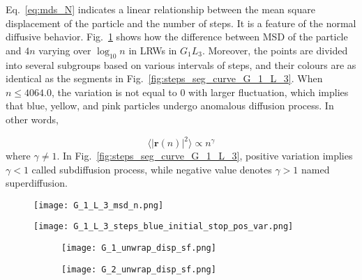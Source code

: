      Eq.~\ref{eq:mds_N} indicates a linear relationship between the
     mean square displacement of the particle and the number of
     steps. It is a feature of the normal diffusive
     behavior. Fig.~\ref{fig:G_1_L_3_msd_n} shows how the difference
     between MSD of the particle and $4n$ varying over $\log_{10}n$ in
     LRWs in $G_1L_3$. Moreover, the points are divided into several
     subgroups based on various intervals of steps, and their colours
     are as identical as the segments in
     Fig.~\ref{fig:steps_seg_curve_G_1_L_3}. When $n \leq 4064.0$, the
     variation is not equal to $0$ with larger fluctuation, which
     implies that blue, yellow, and pink particles undergo anomalous
     diffusion process. In other words,

     \begin{equation}\label{eq:anomalous_diffusion}
       \langle \lvert \bm{r}(n) \lvert^2 \rangle \propto n^{\gamma}
     \end{equation}
     where $\gamma \ne 1$. In Fig.~\ref{fig:steps_seg_curve_G_1_L_3},
     positive variation implies $\gamma < 1$ called subdiffusion
     process, while negative value denotes $\gamma > 1$ named
     superdiffusion.

     
      
      \begin{figure}
         \centering
         \texttt{[image: G\_1\_L\_3\_msd\_n.png]}
         \caption{}
         \label{fig:G_1_L_3_msd_n}
      \end{figure}

      \begin{figure}
         \centering
         \texttt{[image: G\_1\_L\_3\_steps\_blue\_initial\_stop\_pos\_var.png]}
         \caption{}
         \label{fig:G_1_L_3_var_initial_stop_pos}
      \end{figure}

      
      

      \begin{figure}
        \centering
        
        \begin{subfigure}[b]{0.45\textwidth}
          \texttt{[image: G\_1\_unwrap\_disp\_sf.png]}
          \caption{}
          \label{fig:sf_g1_branch_disp}
        \end{subfigure}
        \hfill
        \begin{subfigure}[b]{0.45\textwidth}
          \texttt{[image: G\_2\_unwrap\_disp\_sf.png]}
          \caption{}
          \label{fig:sf_g2_branch_disp}
        \end{subfigure}

        \caption{}
        \label{fig:sf_branch_disp}

      \end{figure}




